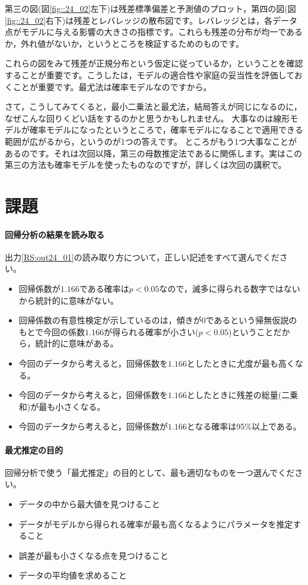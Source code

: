 \documentclass{ltjbook}
\begin{document}
第三の図(図\ref{fig::24_02}左下)は残差標準偏差と予測値のプロット，第四の図(図\ref{fig::24_02}右下)は残差とレバレッジの散布図です。レバレッジとは，各データ点がモデルに与える影響の大きさの指標です。これらも残差の分布が均一であるか，外れ値がないか，というところを検証するためのものです。

これらの図をみて残差が正規分布という仮定に従っているか，ということを確認することが重要です。こうしたは，モデルの適合性や家庭の妥当性を評価しておくことが重要です。最尤法は確率モデルなのですから。

さて，こうしてみてくると，最小二乗法と最尤法，結局答えが同じになるのに，なぜこんな回りくどい話をするのかと思うかもしれません。
大事なのは線形モデルが確率モデルになったというところで，確率モデルになることで適用できる範囲が広がるから，というのが1つの答えです。
ところがもう1つ大事なことがあるのです。それは次回以降，第三の母数推定法であるに関係します。実はこの第三の方法も確率モデルを使ったものなのですが，詳しくは次回の講釈で。

\section{課題}
\paragraph{回帰分析の結果を読み取る}出力\ref{RS:out24_01}の読み取り方について，正しい記述をすべて選んでください。
\begin{itemize}
	\item 回帰係数が$1.166$である確率は$p<0.05$なので，滅多に得られる数字ではないから統計的に意味がない。
	\item 回帰係数の有意性検定が示しているのは，傾きが0であるという帰無仮説のもとで今回の係数$1.166$が得られる確率が小さい($p<0.05$)ということだから，統計的に意味がある。
	\item 今回のデータから考えると，回帰係数を$1.166$としたときに尤度が最も高くなる。
	\item 今回のデータから考えると，回帰係数を$1.166$としたときに残差の総量(二乗和)が最も小さくなる。
	\item 今回のデータから考えると，回帰係数が$1.166$となる確率は95\%以上である。
\end{itemize}

\paragraph{最尤推定の目的}
回帰分析で使う「最尤推定」の目的として、最も適切なものを一つ選んでください。
\begin{itemize}
	\item データの中から最大値を見つけること
	\item データがモデルから得られる確率が最も高くなるようにパラメータを推定すること
	\item 誤差が最も小さくなる点を見つけること
	\item データの平均値を求めること
\end{itemize}
\end{document}
